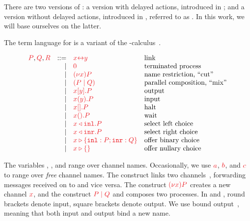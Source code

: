 \documentclass[UKenglish]{llncs}
\begin{document}
There are two versions of \dhcp: a version with delayed actions, introduced in \textcite{kokke2019pacmpl}; and a version without delayed actions, introduced in \textcite{kokke2018tlla}, referred to as \hcp. In this work, we will base ourselves on the latter.

The term language for \hcp is a variant of the \textpi-calculus~\parencite{milner1992b}.
\begin{definition}[Terms]\label{def:hcp-terms}
  \[
    \begin{array}{lrll}
      \tm{P}, \tm{Q}, \tm{R}
        & ::=& \tm{\cpLink{x}{y}}    &\text{link}
      \\&\mid& \tm{\piHalt}          &\text{terminated process}
      \\&\mid& \tm{\piNew{x}{P}}     &\text{name restriction, ``cut''}
      \\&\mid& \tm{( \piPar{P}{Q} )} &\text{parallel composition, ``mix''}
      \\&\mid& \tm{\piSend{x}{y}{P}} &\text{output}
      \\&\mid& \tm{\piRecv{x}{y}{P}} &\text{input}
      \\&\mid& \tm{\piSend{x}{}{P}}  &\text{halt}
      \\&\mid& \tm{\cpWait{x}{}{P}}  &\text{wait}
      \\&\mid& \tm{\cpInl{x}{P}}     &\text{select left choice}
      \\&\mid& \tm{\cpInr{x}{P}}     &\text{select right choice}
      \\&\mid& \tm{\cpCase{x}{P}{Q}} &\text{offer binary choice}
      \\&\mid& \tm{\cpAbsurd{x}}     &\text{offer nullary choice}
    \end{array}
  \]
\end{definition}\noindent
The variables , ,  and  range over channel names. Occasionally, we use $\tm{a}$, $\tm{b}$, and $\tm{c}$ to range over \emph{free} channel names. The construct  links two channels~\parencite{sangiorgi1996,boreale1998}, forwarding messages received on  to  and vice versa. The construct $\tm{\piNew{x}{P}}$ creates a new channel $\tm{x}$, and the construct $\tm{\piPar{P}{Q}}$ and composes two processes. In  and , round brackets denote input, square brackets denote output. We use bound output~\parencite{sangiorgi1996}, meaning that both input and output bind a new name. 
\end{document}
